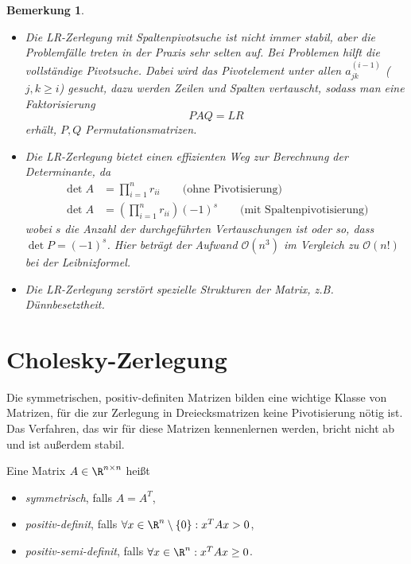 \documentclass{mycourse}
\newtheorem{notee}[thm]{Bemerkung}
\begin{document}
\begin{notee}
	\label{note:3.11}
	\begin{itemize}
		\item
			Die LR-Zerlegung mit Spaltenpivotsuche ist nicht immer stabil, aber die Problemfälle treten in der Praxis sehr selten auf.
			Bei Problemen hilft die vollständige Pivotsuche.
			Dabei wird das Pivotelement unter allen $a_{jk}^{(i-1)}$ ($j,k\ge i$) gesucht, dazu werden Zeilen und Spalten vertauscht, sodass man eine Faktorisierung
			\[
				PAQ = LR
			\]
			erhält, $P,Q$ Permutationsmatrizen.
		\item
			Die LR-Zerlegung bietet einen effizienten Weg zur Berechnung der Determinante, da
			\begin{align*}
				\det A &= \prod_{i=1}^n r_{ii} \qquad \text{(ohne Pivotisierung)}\\
				\det A &= \left(\prod_{i=1}^n r_{ii}\right) (-1)^s \qquad \text{(mit Spaltenpivotisierung)}
			\end{align*}
			wobei $s$ die Anzahl der durchgeführten Vertauschungen ist oder so, dass $\det P = (-1)^s$.
			Hier beträgt der Aufwand $\mathcal O(n^3)$ im Vergleich zu $\mathcal O(n!)$ bei der Leibnizformel.
		\item
			Die LR-Zerlegung zerstört spezielle Strukturen der Matrix, z.B. Dünnbesetztheit.
	\end{itemize}
\end{notee}

\section{Cholesky-Zerlegung}

Die symmetrischen, positiv-definiten Matrizen bilden eine wichtige Klasse von Matrizen, für die zur Zerlegung in Dreiecksmatrizen keine Pivotisierung nötig ist.
Das Verfahren, das wir für diese Matrizen kennenlernen werden, bricht nicht ab und ist außerdem stabil.

\begin{df}
	\label{df:3.12}
	Eine Matrix $A\in \R^{n\times n}$ heißt
	\begin{itemize}
		\item \emph{symmetrisch}, falls $A = A^T$,
		\item \emph{positiv-definit}, falls $\forall x \in \R^n \setminus \{0\} : x^TAx > 0$,
		\item \emph{positiv-semi-definit}, falls $\forall x \in \R^n : x^TAx \ge 0$.
	\end{itemize}
\end{df}
\end{document}
